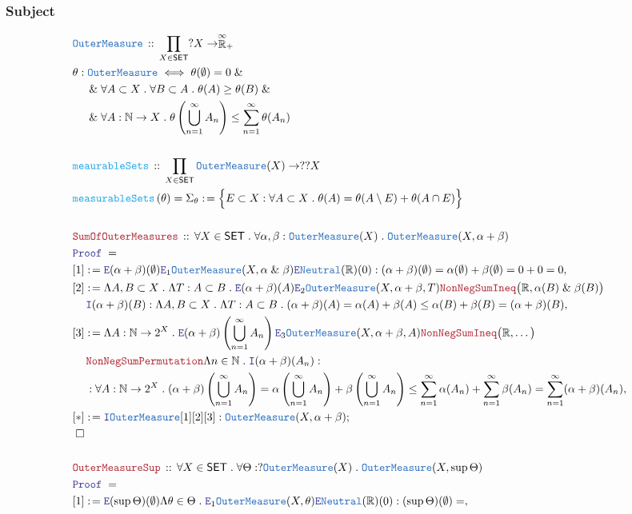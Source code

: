 \documentclass[12pt]{scrartcl}
\newcommand{\TYPE}[1]{\textcolor{NavyBlue}{\mathtt{#1}}}
\newcommand{\FUNC}[1]{\textcolor{Cerulean}{\mathtt{#1}}}
\newcommand{\LOGIC}[1]{\textcolor{Blue}{\mathtt{#1}}}
\newcommand{\THM}[1]{\textcolor{Maroon}{\mathtt{#1}}}
\renewcommand{\.}{\; . \;}
\newcommand{\de}{: \kern 0.1pc =}
\newcommand{\Act}[1]{\left( #1 \right)}
\newcommand{\Theorem}[2]{& \THM{#1} \, :: \, #2 \\ & \Proof = \\ }
\newcommand{\DeclareType}[2]{& \TYPE{#1} \, :: \, #2 \\}
\newcommand{\DefineType}[3]{& #1 : \TYPE{#2} \iff #3 \\}
\newcommand{\DeclareFunc}[2]{& \FUNC{#1} \, :: \, #2 \\}
\newcommand{\DefineNamedFunc}[4]{&  \FUNC{#1}\Act{#2} = #3 \de #4 \\}
\newcommand{\NewLine}{\\ & \kern 1pc}
\newcommand{\Page}[1]{ \begin{align*} #1 \end{align*}   }
\renewcommand{\And}{\; \& \;}
\newcommand{\Intro}{\LOGIC{I}}
\newcommand{\Elim}{\LOGIC{E}}
\newcommand{\Reals}{\mathbb{R} }
\newcommand{\Nat}{\mathbb{N} }
\newcommand{\EReals}{\stackrel{\mathclap{\infty}}{\mathbb{R}}}
\newcommand{\Say}[3]{& #1 \de #2 : #3, \\}
\newcommand{\Conclude}[3]{& #1 \de #2 : #3; \\}
\newcommand{\QED}{\; \square}
\newcommand{\EndProof}{& \QED \\}
\newcommand{\Proof}{\LOGIC{Proof} \; }
\newcommand{\SET}{\mathsf{SET}}
\newcommand{\OM}{\TYPE{OuterMeasure}}
\begin{document}
\subsubsection{Subject}
\Page{
	\DeclareType{\OM}
	{
		\prod_{X \in \SET} ?X \to \EReals_+
	}
	\DefineType{\theta}{\OM}
	{
		\theta(\emptyset) = 0 \And \NewLine \And
		\forall A \subset X \. \forall B \subset A \. \theta(A) \ge \theta(B) \And \NewLine \And
		\forall A : \Nat \to X \. \theta\left( \bigcup^\infty_{n=1} A_n\right) \le \sum^\infty_{n=1} \theta(A_n)
	}
	\\
	\DeclareFunc{meaurableSets}
	{
		\prod_{X \in \SET} \OM(X) \to ??X
	}
	\DefineNamedFunc{measurableSets}{\theta}{\Sigma_\theta}
	{
		\Big\{ E \subset X : \forall A \subset X \. \theta(A) = \theta(A \setminus E) + \theta(A \cap E)   \Big\}
	}
	\\
	\Theorem{SumOfOuterMeasures}
	{
		\forall X \in \SET \.
		\forall \alpha,\beta : \OM(X) \.
		\OM(X,\alpha + \beta)
	}
	\Say{[1]}{\Elim (\alpha + \beta)(\emptyset)  \Elim_1 \OM(X,\alpha \And \beta) \Elim 
		\TYPE{Neutral}(\Reals)(0)
	}
	{
		(\alpha + \beta)(\emptyset) =
		\alpha(\emptyset) + \beta(\emptyset) = 
		0 + 0 =
		0
	}
	\Say{[2]}
	{
		\Lambda A,B \subset X \.
		\Lambda T : A \subset B \.
		\Elim 	(\alpha + \beta)(A)
		\Elim_2 \OM(X,\alpha + \beta, T) 
		\THM{NonNegSumIneq}\big(\Reals,\alpha(B) \And \beta(B)\big) \NewLine
		\Intro (\alpha + \beta)(B)
	}
	{
		\Lambda A,B \subset X \.
		\Lambda T : A \subset B \.
		(\alpha + \beta)(A) =
		\alpha(A) + \beta(A) \le 
		\alpha(B) + \beta(B)  =
		(\alpha + \beta)(B)
	}
	\Say{[3]}
	{
		\Lambda A : \Nat \to 2^X \.
		\Elim (\alpha + \beta)\left( \bigcup^\infty_{n=1} A_n \right)
		\Elim_3 \OM(X,\alpha + \beta,A)
		\THM{NonNegSumIneq}\big(\Reals,\ldots\big) \NewLine
		\THM{NonNegSumPermutation}
		\Lambda n \in \Nat \.
		\Intro (\alpha + \beta)(A_n)		
	}
	{
		\NewLine :		
		\forall A : \Nat \to 2^X \.
		(\alpha + \beta)\left( \bigcup^\infty_{n=1} A_n \right) =
		\alpha\left( \bigcup^\infty_{n=1} A_n \right) +
		\beta\left( \bigcup^\infty_{n=1} A_n \right) \le
		\sum^\infty_{n=1} \alpha(A_n) +
		\sum^\infty_{n=1} \beta(A_n) =
		\sum^\infty_{n=1} (\alpha + \beta)(A_n)		
	}
	\Conclude{[*]}{
		\Intro \OM [1][2][3]	
	}
	{
		\OM(X,\alpha + \beta)
	}
	\EndProof
	\\
	\Theorem{OuterMeasureSup}
	{
		\forall X \in \SET \.
		\forall \Theta : ?\OM(X) \.
		\OM(X,\sup \Theta)
	}
	\Say{[1]}{\Elim (\sup \Theta )(\emptyset)  
		\Lambda \theta \in \Theta \.		
		\Elim_1 \OM(X,\theta) \Elim 
		\TYPE{Neutral}(\Reals)(0)
	}
	{
		(\sup \Theta)(\emptyset) =
}}
\end{document}
